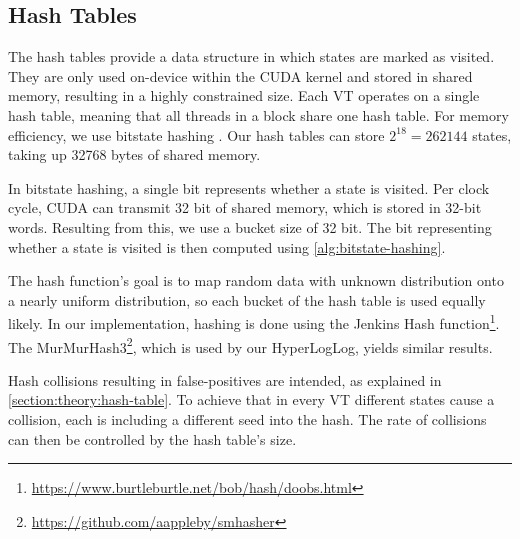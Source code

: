 \documentclass[
fancyheadings, %
%
%
]{stsreprt}
\begin{document}

\subsection{Hash Tables}
\label{section:implementation:hash-tables}

The hash tables provide a data structure in which states are marked as visited.
They are only used on-device within the CUDA kernel and stored in shared memory, resulting in a highly constrained size.
Each VT operates on a single hash table, meaning that all threads in a block share one hash table.
For memory efficiency, we use bitstate hashing \cite{DeFrancisco2020.Grapple}.
Our hash tables can store $2^{18}=\num{262144}$ states, taking up \num{32768} bytes of shared memory.

In bitstate hashing, a single bit represents whether a state is visited.
Per clock cycle, CUDA can transmit 32 bit of shared memory, which is stored in 32-bit words.
Resulting from this, we use a bucket size of 32 bit.
The bit representing whether a state is visited is then computed using \cref{alg:bitstate-hashing}.

The hash function's goal is to map random data with unknown distribution onto a nearly uniform distribution, so each bucket of the hash table is used equally likely.
In our implementation, hashing is done using the Jenkins Hash function\footnote{\url{https://www.burtleburtle.net/bob/hash/doobs.html}}.
The MurMurHash3\footnote{\url{https://github.com/aappleby/smhasher}}, which is used by our HyperLogLog, yields similar results.

Hash collisions resulting in false-positives are intended, as explained in \cref{section:theory:hash-table}.
To achieve that in every VT different states cause a collision, each is including a different seed into the hash.
The rate of collisions can then be controlled by the hash table's size.
\end{document}
